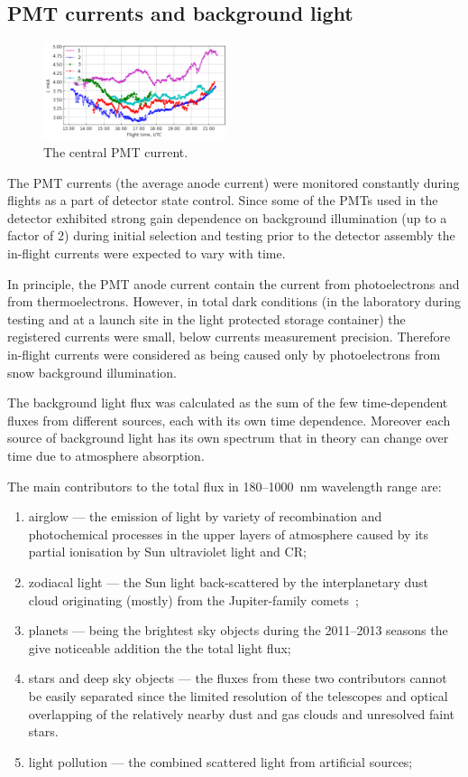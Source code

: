 \documentclass[final,5p,times,twocolumn]{elsarticle}
\begin{document}
\subsection{PMT currents and background light}

\begin{figure}[tb]
    \includegraphics[width=0.48\textwidth]{figs/cur2013_PMT1.pdf}
    \caption{The central PMT current.}
\label{fig:current}
\end{figure}

The PMT currents (the average anode current) were monitored constantly during flights as a part of detector state control. Since some of the PMTs used in the detector exhibited strong gain dependence on background illumination (up to a factor of 2) during initial selection and testing prior to the detector assembly the in-flight currents were expected to vary with time.

In principle, the PMT anode current contain the current from photoelectrons and from thermoelectrons. However, in total dark conditions (in the laboratory during testing and at a launch site in the light protected storage container) the registered currents were small, below currents measurement precision. Therefore in-flight currents were considered as being caused only by photoelectrons from snow background illumination.

The background light flux was calculated as the sum of the few time-dependent fluxes from different sources, each with its own time dependence. Moreover each source of background light has its own spectrum that in theory can change over time due to atmosphere absorption.

The main contributors to the total flux in 180--1000~nm wavelength range are:
\begin{enumerate}
    \item airglow --- the emission of light by variety of recombination and photochemical processes in the upper layers of atmosphere caused by its partial ionisation by Sun ultraviolet light and CR;
    \item zodiacal light --- the Sun light back-scattered by the interplanetary dust cloud originating (mostly) from the Jupiter-family comets~\cite{Nesvorn__2010};
    \item planets --- being the brightest sky objects during the 2011--2013 seasons the give noticeable addition the the total light flux;
    \item stars and deep sky objects --- the fluxes from these two contributors cannot be easily separated since the limited resolution of the telescopes and optical overlapping of the relatively nearby dust and gas clouds and unresolved faint stars.
    \item light pollution --- the combined scattered light from artificial sources;
\end{enumerate}
\end{document}
